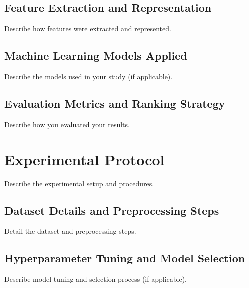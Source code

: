 
\subsection{Feature Extraction and Representation}

Describe how features were extracted and represented.

\subsection{Machine Learning Models Applied}

Describe the models used in your study (if applicable).

\subsection{Evaluation Metrics and Ranking Strategy}

Describe how you evaluated your results.

\section{Experimental Protocol}

Describe the experimental setup and procedures.

\subsection{Dataset Details and Preprocessing Steps}

Detail the dataset and preprocessing steps.

\subsection{Hyperparameter Tuning and Model Selection}

Describe model tuning and selection process (if applicable).

